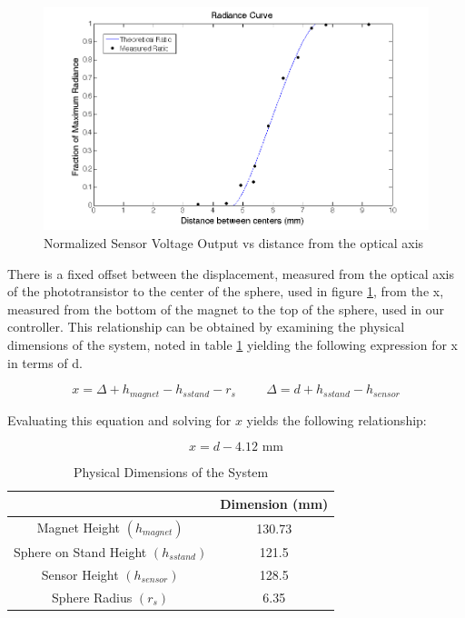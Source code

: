 \documentclass{article}
\theoremstyle{plain}
\theoremstyle{definition}
\theoremstyle{remark}
\begin{document}
\begin{figure}
\begin{center}
\includegraphics[width = 15cm]{SensorRadianceCurve.png}
\caption{Normalized Sensor Voltage Output vs distance from the optical axis}
\label{Q1_d1}
\end{center}
\end{figure}

There is a fixed offset between the displacement, measured from the optical axis of the phototransistor to the center of the sphere, used in figure \ref{Q1_d1}, from the x, measured from the bottom of the magnet to the top of the sphere, used in our controller.  This relationship can be obtained by examining the physical dimensions of the system, noted in table \ref{Q1_dt2} yielding the following expression for x in terms of d.

$$ x = \Delta + h_{magnet} - h_{s stand} - r_{s} \hspace{1cm} \Delta = d + h_{s stand} - h_{sensor} $$

Evaluating this equation and solving for $x$ yields the following relationship:

$$ x = d - 4.12 \text{ mm} $$

\begin{table}
\begin{center}
    \begin{tabular}{|c|c|}
        \hline
        ~                                    & Dimension (mm) \\ \hline
        Magnet Height $(h_{magnet}) $          & 130.73         \\ 
        Sphere on Stand Height $(h_{s stand})$ & 121.5          \\ 
        Sensor Height $(h_{sensor})$           & 128.5          \\ 
        Sphere Radius $(r_{s})$                & 6.35           \\
        \hline
    \end{tabular}
\caption{Physical Dimensions of the System}
\label{Q1_dt2}
\end{center}
\end{table}
\end{document}
